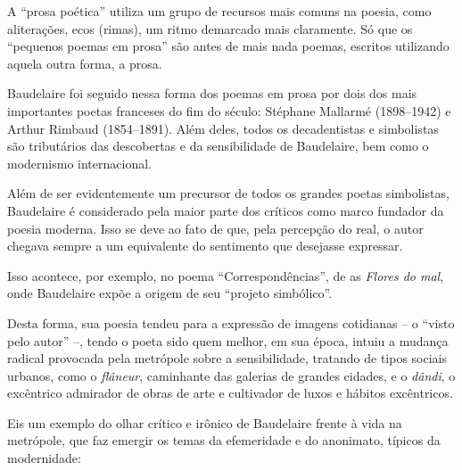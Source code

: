\documentclass[12pt]{extarticle}
\begin{document}
A ``prosa poética'' utiliza um grupo de recursos mais comuns na poesia,
como aliterações, ecos (rimas), um ritmo demarcado mais claramente.
Só que os ``pequenos poemas em prosa'' são antes de mais nada poemas,
escritos utilizando aquela outra forma, a prosa.
 
Baudelaire foi seguido nessa forma dos poemas em prosa por dois dos mais
importantes poetas franceses do fim do século: Stéphane Mallarmé (1898--1942) 
e Arthur Rimbaud (1854--1891).
Além deles, todos os decadentistas e simbolistas são tributários das
descobertas e da sensibilidade de Baudelaire, bem como o modernismo
internacional.

Além de ser evidentemente um precursor de todos os grandes poetas simbolistas,
Baudelaire é considerado pela maior parte dos críticos como marco fundador da
poesia moderna. Isso se deve ao fato de que, pela percepção do real, o autor chegava
sempre a um equivalente do sentimento que desejasse expressar. 

Isso acontece, por exemplo, no poema ``Correspondências'', de as \textit{Flores do mal},
onde Baudelaire expõe a origem de seu ``projeto simbólico''. 
 
Desta forma, sua poesia tendeu para a expressão de imagens cotidianas -- o ``visto
pelo autor'' --, tendo o poeta sido quem melhor, em sua época, intuiu a mudança
radical provocada pela metrópole sobre a sensibilidade, tratando de tipos
sociais urbanos, como o \textit{flâneur}, caminhante das galerias de grandes cidades,
e o \textit{dândi}, o excêntrico admirador de obras de arte e cultivador de luxos e
hábitos excêntricos.


Eis um exemplo do olhar crítico e irônico de Baudelaire frente à vida na metrópole,
que faz emergir os temas da efemeridade e do anonimato, típicos da modernidade:
 
\end{document}
